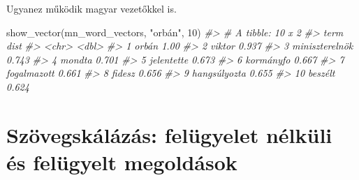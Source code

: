 \documentclass[
]{book}
\newenvironment{Shaded}{\begin{snugshade}}{\end{snugshade}}
\newcommand{\CommentTok}[1]{\textcolor[rgb]{0.56,0.35,0.01}{\textit{#1}}}
\newcommand{\DecValTok}[1]{\textcolor[rgb]{0.00,0.00,0.81}{#1}}
\newcommand{\FunctionTok}[1]{\textcolor[rgb]{0.00,0.00,0.00}{#1}}
\newcommand{\NormalTok}[1]{#1}
\newcommand{\StringTok}[1]{\textcolor[rgb]{0.31,0.60,0.02}{#1}}
\begin{document}
Ugyanez működik magyar vezetőkkel is.

\begin{Shaded}
\begin{Highlighting}[]
\FunctionTok{show\_vector}\NormalTok{(mn\_word\_vectors, }\StringTok{"orbán"}\NormalTok{, }\DecValTok{10}\NormalTok{)}
\CommentTok{\#\textgreater{} \# A tibble: 10 x 2}
\CommentTok{\#\textgreater{}    term            dist}
\CommentTok{\#\textgreater{}    \textless{}chr\textgreater{}          \textless{}dbl\textgreater{}}
\CommentTok{\#\textgreater{}  1 orbán          1.00 }
\CommentTok{\#\textgreater{}  2 viktor         0.937}
\CommentTok{\#\textgreater{}  3 miniszterelnök 0.743}
\CommentTok{\#\textgreater{}  4 mondta         0.701}
\CommentTok{\#\textgreater{}  5 jelentette     0.673}
\CommentTok{\#\textgreater{}  6 kormányfo      0.667}
\CommentTok{\#\textgreater{}  7 fogalmazott    0.661}
\CommentTok{\#\textgreater{}  8 fidesz         0.656}
\CommentTok{\#\textgreater{}  9 hangsúlyozta   0.655}
\CommentTok{\#\textgreater{} 10 beszélt        0.624}
\end{Highlighting}
\end{Shaded}

\hypertarget{szuxf6vegskuxe1luxe1zuxe1s-feluxfcgyelet-nuxe9lkuxfcli-uxe9s-feluxfcgyelt-megolduxe1sok}{%
\chapter{Szövegskálázás: felügyelet nélküli és felügyelt
megoldások}\label{szuxf6vegskuxe1luxe1zuxe1s-feluxfcgyelet-nuxe9lkuxfcli-uxe9s-feluxfcgyelt-megolduxe1sok}}
\end{document}
